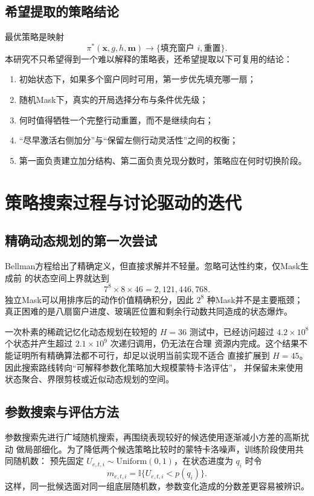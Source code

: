 \documentclass[UTF8,11pt,openany]{ctexrep}
\newcommand{\ind}{\mathbb{I}}
\newcommand{\xvec}{\boldsymbol{x}}
\newcommand{\mvec}{\boldsymbol{m}}
\begin{document}
\section{希望提取的策略结论}

最优策略是映射
\[
\pi^*(\xvec,g,h,\mvec)
\longrightarrow
\{\text{填充窗户 }i,\text{重置}\}.
\]
本研究不只希望得到一个难以解释的策略表，还希望提取以下可复用的结论：
\begin{enumerate}[leftmargin=*]
    \item 初始状态下，如果多个窗户同时可用，第一步优先填充哪一扇；
    \item 随机Mask下，真实的开局选择分布与条件优先级；
    \item 何时值得牺牲一个完整行动重置，而不是继续向右；
    \item “尽早激活右侧加分”与“保留左侧行动灵活性”之间的权衡；
    \item 第一面负责建立加分结构、第二面负责兑现分数时，策略应在何时切换阶段。
\end{enumerate}

\chapter{策略搜索过程与讨论驱动的迭代}

\section{精确动态规划的第一次尝试}

Bellman方程给出了精确定义，但直接求解并不轻量。忽略可达性约束，仅Mask生成前
的状态空间上界就达到
\[
7^8\times 8\times 46=2{,}121{,}446{,}768.
\]
独立Mask可以用排序后的动作价值精确积分，因此 $2^8$ 种Mask并不是主要瓶颈；
真正困难的是八扇窗户进度、玻璃匠位置和剩余行动数共同造成的状态爆炸。

一次朴素的稀疏记忆化动态规划在较短的 $H=36$ 测试中，已经访问超过
$4.2\times10^8$ 个状态并产生超过 $2.1\times10^9$ 次递归调用，仍无法在合理
资源内完成。这个结果不能证明所有精确算法都不可行，却足以说明当前实现不适合
直接扩展到 $H=45$。因此搜索路线转向“可解释参数化策略加大规模蒙特卡洛评估”，
并保留未来使用状态聚合、界限剪枝或近似动态规划的空间。

\section{参数搜索与评估方法}

参数搜索先进行广域随机搜索，再围绕表现较好的候选使用逐渐减小方差的高斯扰动
做局部细化。为了降低两个候选策略比较时的蒙特卡洛噪声，训练阶段使用共同随机数：
预先固定 $U_{e,t,i}\sim\mathrm{Uniform}(0,1)$，在状态进度为 $q_i$ 时令
\[
m_{e,t,i}=\ind\{U_{e,t,i}<p(q_i)\}.
\]
这样，同一批候选面对同一组底层随机数，参数变化造成的分数差更容易被辨识。
\end{document}
